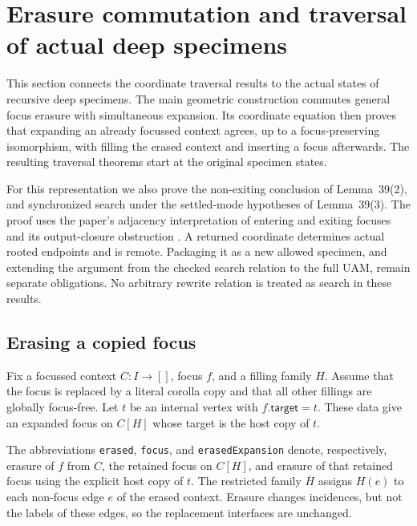\section{Erasure commutation and traversal of actual deep specimens}
\label{sec:specimen-traversal}
This section connects the coordinate traversal results to the actual states of
recursive deep specimens. The main geometric construction commutes general
focus erasure with simultaneous expansion. Its coordinate equation then proves
that expanding an already focussed context agrees, up to a focus-preserving
isomorphism, with filling the erased context and inserting a focus afterwards.
The resulting traversal theorems start at the original specimen states.

For this representation we also prove the non-exiting conclusion of
Lemma~39(2), and synchronized search under the settled-mode hypotheses of
Lemma~39(3). The proof uses the paper's adjacency interpretation of entering
and exiting focuses and its output-closure obstruction \cite{paper}. A returned
coordinate determines actual rooted endpoints and is remote. Packaging it as a
new allowed specimen, and extending the argument from the checked search
relation to the full UAM, remain separate obligations. No arbitrary rewrite
relation is treated as search in these results.

\subsection{Erasing a copied focus}
Fix a focussed context $C:I\to[]$, focus $f$, and a filling family $H$. Assume
that the focus is replaced by a literal corolla copy and that all other fillings
are globally focus-free. Let $t$ be an internal vertex with
$f.\mathsf{target}=t$. These data give an expanded focus on $C[H]$ whose target
is the host copy of $t$.

The abbreviations \texttt{erased}, \texttt{focus}, and
\texttt{erasedExpansion} denote, respectively, erasure of $f$ from $C$, the
retained focus on $C[H]$, and erasure of that retained focus using the explicit
host copy of $t$. The restricted family $\overline H$ assigns $H(e)$ to each
non-focus edge $e$ of the erased context. Erasure changes incidences, but not
the labels of these edges, so the replacement interfaces are unchanged.

